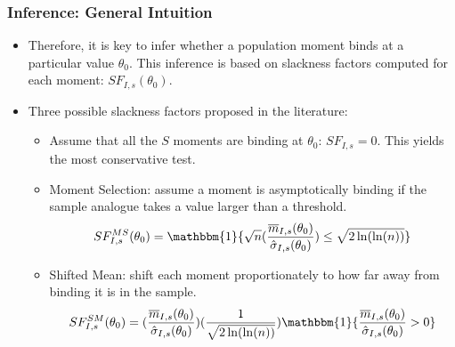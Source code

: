 \documentclass[10pt,letterpaper]{beamer}
\begin{document}
\begin{frame}
\frametitle{Inference: General Intuition}

\begin{itemize}
	\item Therefore, it is key to infer whether a population moment binds at a particular value $\theta_{0}$. This inference is based on slackness factors computed for each moment: $SF_{I,s}(\theta_{0})$. 
	\item Three possible slackness factors proposed in the literature:
	\begin{itemize}
		\item Assume that all the $S$ moments are binding at $\theta_{0}$: $SF_{I,s}=0$. This yields the most conservative test.
		\item Moment Selection: assume a moment is asymptotically binding if the sample analogue takes a value larger than a threshold.
		\begin{equation*}
		SF^{MS}_{I,s}(\theta_{0})=\mathbbm{1}\{\sqrt{n}(\frac{\overline{m}_{I,s}(\theta_{0})}{\hat{\sigma }_{I,s}(\theta_{0})})\leq\sqrt{2\ln (\ln (n))}\}
		\end{equation*}
		\item Shifted Mean: shift each moment proportionately to how far away from binding it is in the sample.
		\begin{equation*}
		SF^{SM}_{I,s}(\theta_{0})=(\frac{\overline{m}_{I,s}(\theta_{0})}{\hat{\sigma}_{I,s}(\theta_{0})})(\frac{1}{\sqrt{2\ln(\ln (n))}})\mathbbm{1}\{\frac{\overline{m}_{I,s}(\theta_{0})}{\hat{\sigma}_{I,s}(\theta_{0})}>0\}
		\end{equation*}
	\end{itemize}
\end{itemize}
\end{frame}
\end{document}
